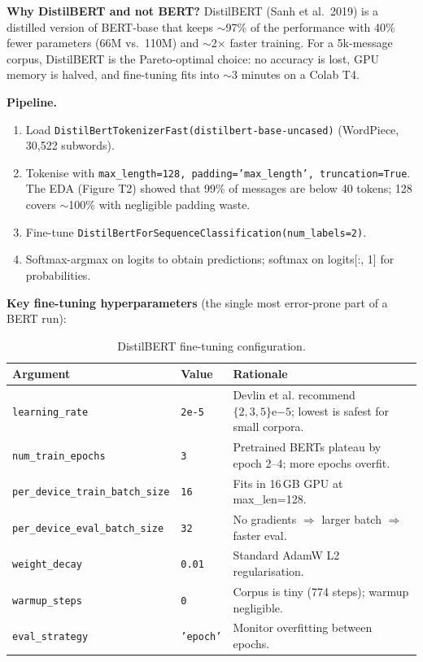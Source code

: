 \textbf{Why DistilBERT and not BERT?} DistilBERT (Sanh et al.\ 2019) is a distilled version of BERT-base that keeps $\sim$97\% of the performance with 40\% fewer parameters (66M vs.\ 110M) and $\sim$2$\times$ faster training. For a 5k-message corpus, DistilBERT is the Pareto-optimal choice: no accuracy is lost, GPU memory is halved, and fine-tuning fits into $\sim$3 minutes on a Colab T4.

\textbf{Pipeline.}
\begin{enumerate}
    \item Load \texttt{DistilBertTokenizerFast(distilbert-base-uncased)} (WordPiece, 30{,}522 subwords).
    \item Tokenise with \texttt{max\_length=128, padding='max\_length', truncation=True}. The EDA (Figure T2) showed that 99\% of messages are below 40 tokens; 128 covers $\sim$100\% with negligible padding waste.
    \item Fine-tune \texttt{DistilBertForSequenceClassification(num\_labels=2)}.
    \item Softmax-argmax on logits to obtain predictions; softmax on logits[:, 1] for probabilities.
\end{enumerate}

\textbf{Key fine-tuning hyperparameters} (the single most error-prone part of a BERT run):

\begin{table}[H]
\centering
\caption{DistilBERT fine-tuning configuration.}
\begin{tabular}{lll}
\hline
\textbf{Argument} & \textbf{Value} & \textbf{Rationale} \\
\hline
\texttt{learning\_rate}        & \texttt{2e-5}  & Devlin et al. recommend $\{2,3,5\}\mathrm{e}{-5}$; lowest is safest for small corpora. \\
\texttt{num\_train\_epochs}    & \texttt{3}     & Pretrained BERTs plateau by epoch 2--4; more epochs overfit. \\
\texttt{per\_device\_train\_batch\_size} & \texttt{16} & Fits in 16\,GB GPU at max\_len=128. \\
\texttt{per\_device\_eval\_batch\_size}  & \texttt{32} & No gradients $\Rightarrow$ larger batch $\Rightarrow$ faster eval. \\
\texttt{weight\_decay}         & \texttt{0.01} & Standard AdamW L2 regularisation. \\
\texttt{warmup\_steps}         & \texttt{0}    & Corpus is tiny (774 steps); warmup negligible. \\
\texttt{eval\_strategy}        & \texttt{'epoch'} & Monitor overfitting between epochs. \\
\hline
\end{tabular}
\end{table}


